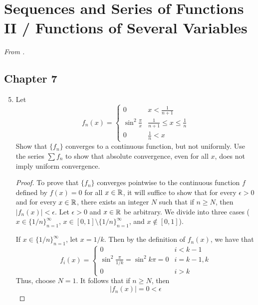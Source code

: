 \documentclass[../psets.tex]{subfiles}
\begin{document}
\section{Sequences and Series of Functions II / Functions of Several Variables}
\emph{From \textcite{bib:Rudin}.}
\subsection*{Chapter 7}
\begin{enumerate}[label={\textbf{\arabic*.}}]
    \setcounter{enumi}{4}
    \item {}Let
    \begin{equation*}
        f_n(x) =
        \begin{cases}
            0 & x<\frac{1}{n+1}\\
            \sin^2\frac{\pi}{x} & \frac{1}{n+1}\leq x\leq\frac{1}{n}\\
            0 & \frac{1}{n}<x
        \end{cases}
    \end{equation*}
    Show that $\{f_n\}$ converges to a continuous function, but not uniformly. Use the series $\sum f_n$ to show that absolute convergence, even for all $x$, does not imply uniform convergence.
    \begin{proof}
        To prove that $\{f_n\}$ converges pointwise to the continuous function $f$ defined by $f(x)=0$ for all $x\in\mathbb{R}$, it will suffice to show that for every $\epsilon>0$ and for every $x\in\mathbb{R}$, there exists an integer $N$ such that if $n\geq N$, then $|f_n(x)|<\epsilon$. Let $\epsilon>0$ and $x\in\mathbb{R}$ be arbitrary. We divide into three cases ($x\in\{1/n\}_{n=1}^\infty$, $x\in[0,1]\setminus\{1/n\}_{n=1}^\infty$, and $x\notin[0,1]$).\par\smallskip
        If $x\in\{1/n\}_{n=1}^\infty$, let $x=1/k$. Then by the definition of $f_n(x)$, we have that
        \begin{equation*}
            f_i(x) =
            \begin{cases}
                0 & i<k-1\\
                \sin^2\frac{\pi}{1/k}=\sin^2k\pi=0 & i=k-1,k\\
                0 & i>k
            \end{cases}
        \end{equation*}
        Thus, choose $N=1$. It follows that if $n\geq N$, then
        \begin{equation*}
            |f_n(x)| = 0 < \epsilon

\end{equation*}
\end{proof}
\end{enumerate}
\end{document}
